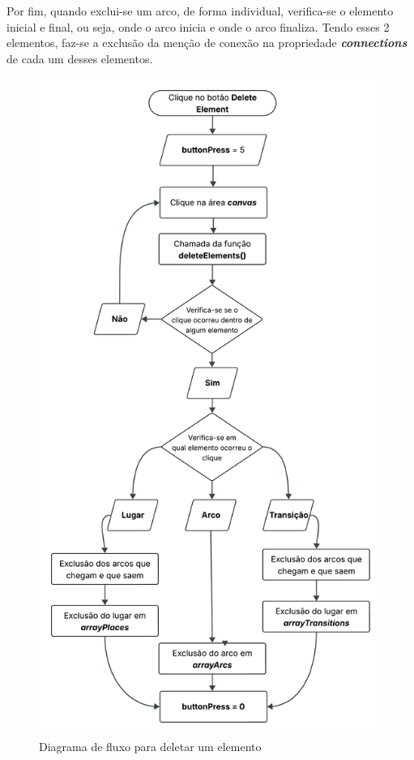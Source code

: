 \documentclass[
	12pt,				%
	openright,			%
	oneside,			%
	a4paper,			%
	english,			%
	brazil				%
	]{abntex2}
\begin{document}
Por fim, quando exclui-se um arco, de forma individual, verifica-se o elemento inicial e final, ou seja, onde o arco inicia e onde o arco finaliza. Tendo esses 2 elementos, faz-se a exclusão da menção de conexão na propriedade \textbf{\textit{connections}} de cada um desses elementos.

\begin{figure}[ht] 
	\centering
	\includegraphics[scale=0.15]{figuras/diagrama-fluxo-deleteElement.png}
	\caption[Diagrama de fluxo para deletar um elemento]{Diagrama de fluxo para deletar um elemento}
	\label{fig:deleteElementDiagram}
\end{figure}
\FloatBarrier
\end{document}
